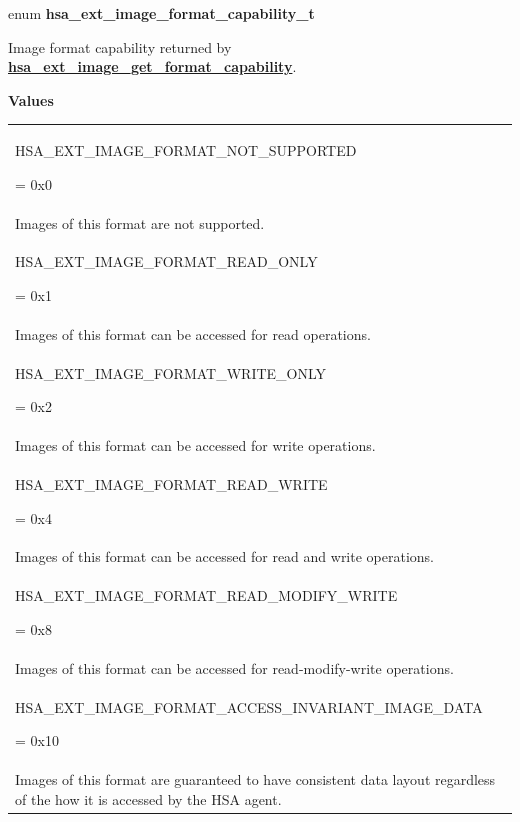 \documentclass[final]{book}
\newcommand{\reffun}[1]{\textbf{#1}}
\newcommand{\reftyp}[1]{#1}
\newcommand{\refenu}[1]{\reftyp{#1}}
\begin{document}
\noindent\begin{tcolorbox}[breakable,nobeforeafter,arc=0mm,colframe=white,colback=lightgray,left=0mm]
enum \hypertarget{group__images_1gaef83852ae5fb54b82317e96990da388a}{\textbf{hsa_ext_image_format_capability_t}}
\end{tcolorbox}
Image format capability returned by \hyperlink{group__images_1gac40dc77fcbc5711552cba2e3631181fd}{\reffun{hsa_ext_image_get_format_capability}}.

\noindent\textbf{Values}\\[-5mm]
\begin{longtable}{@{\hspace{2em}}p{\linewidth-2em}}
\hspace{-2em}\hypertarget{group__images_1ggaef83852ae5fb54b82317e96990da388aaae6fb99314cf823319737bd5b622a2f4}{\refenu{HSA_EXT_IMAGE_FORMAT_NOT_SUPPORTED}} = 0x0\\Images of this format are not supported.\\[2mm]
\hspace{-2em}\hypertarget{group__images_1ggaef83852ae5fb54b82317e96990da388aa3db3e90538f1fd5a45d7937f9c881b2a}{\refenu{HSA_EXT_IMAGE_FORMAT_READ_ONLY}} = 0x1\\Images of this format can be accessed for read operations.\\[2mm]
\hspace{-2em}\hypertarget{group__images_1ggaef83852ae5fb54b82317e96990da388aa489215daa4de11d09f2d3c1c8c212fcb}{\refenu{HSA_EXT_IMAGE_FORMAT_WRITE_ONLY}} = 0x2\\Images of this format can be accessed for write operations.\\[2mm]
\hspace{-2em}\hypertarget{group__images_1ggaef83852ae5fb54b82317e96990da388aaf88802f6e05d969561eccbb0a3f39222}{\refenu{HSA_EXT_IMAGE_FORMAT_READ_WRITE}} = 0x4\\Images of this format can be accessed for read and write operations.\\[2mm]
\hspace{-2em}\hypertarget{group__images_1ggaef83852ae5fb54b82317e96990da388aa852e4523bdab4f798240af94cc06aa65}{\refenu{HSA_EXT_IMAGE_FORMAT_READ_MODIFY_WRITE}} = 0x8\\Images of this format can be accessed for read-modify-write operations.\\[2mm]
\hspace{-2em}\hypertarget{group__images_1ggaef83852ae5fb54b82317e96990da388aa286344b2349f73e9f92400f589a05f60}{\refenu{HSA_EXT_IMAGE_FORMAT_ACCESS_INVARIANT_IMAGE_DATA}} = 0x10\\Images of this format are guaranteed to have consistent data layout regardless of the how it is accessed by the HSA agent.
\end{longtable}
\end{document}

